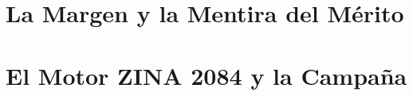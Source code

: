 \documentclass[10pt,a5paper,oneside]{book}
\begin{document}
\frontmatter

\tableofcontents

\mainmatter

\part{La Margen y la Mentira del Mérito}






\part{El Motor ZINA 2084 y la Campaña}





\end{document}
